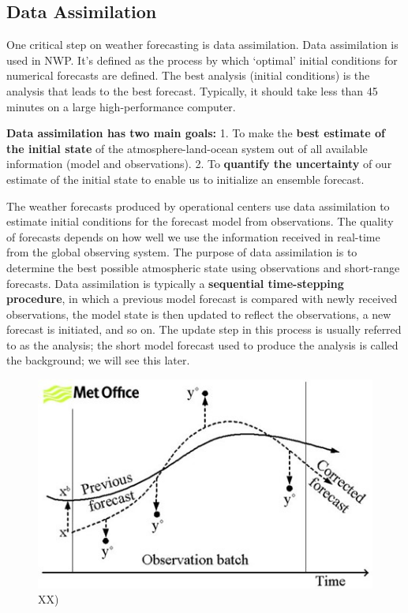 \documentclass[12pt,oneside]{book}
\begin{document}
\subsection{Data Assimilation}\label{data-assimilation}

One critical step on weather forecasting is data assimilation. Data
assimilation is used in NWP. It's defined as the process by which
`optimal' initial conditions for numerical forecasts are defined. The
best analysis (initial conditions) is the analysis that leads to the
best forecast. Typically, it should take less than 45 minutes on a large
high-performance computer.

\textbf{Data assimilation has two main goals:} 1. To make the
\textbf{best estimate of the initial state} of the atmosphere-land-ocean
system out of all available information (model and observations). 2. To
\textbf{quantify the uncertainty} of our estimate of the initial state
to enable us to initialize an ensemble forecast.

The weather forecasts produced by operational centers use data
assimilation to estimate initial conditions for the forecast model from
observations. The quality of forecasts depends on how well we use the
information received in real-time from the global observing system. The
purpose of data assimilation is to determine the best possible
atmospheric state using observations and short-range forecasts. Data
assimilation is typically a \textbf{sequential time-stepping procedure},
in which a previous model forecast is compared with newly received
observations, the model state is then updated to reflect the
observations, a new forecast is initiated, and so on. The update step in
this process is usually referred to as the analysis; the short model
forecast used to produce the analysis is called the background; we will
see this later.

\begin{figure}

{\centering \includegraphics[width=0.8\linewidth]{figures/Figure73} 

}

\caption{XX)}\label{fig:DataAssimilation}
\end{figure}
\end{document}
